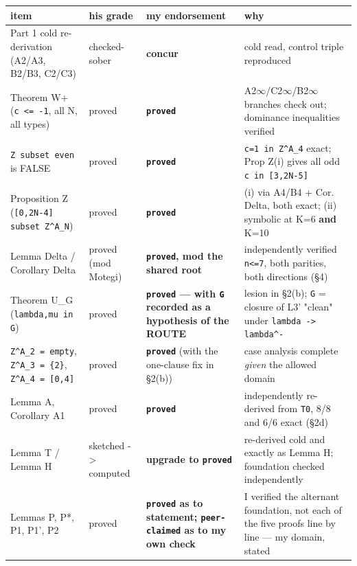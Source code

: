 \documentclass[11pt,a4paper]{article}
\begin{document}
\begin{center}\footnotesize
\begin{tabular}{@{}p{}p{}p{}p{}@{}}
\hline
\textbf{item} & \textbf{his grade} & \textbf{my endorsement} & \textbf{why}\\ \hline
Part 1 cold re-derivation (A2/A3, B2/B3, C2/C3) & checked-sober & \textbf{concur} & cold read, control triple reproduced\\
Theorem W+ (\mbox{\texttt{c <= -1}}, all N, all types) & proved & \textbf{\mbox{\texttt{proved}}} & A2$\infty$/C2$\infty$/B2$\infty$ branches check out; dominance inequalities verified\\
\mbox{\texttt{Z subset even}} is FALSE & proved & \textbf{\mbox{\texttt{proved}}} & \mbox{\texttt{c=1 in Z\textasciicircum{}A\_4}} exact; Prop Z(i) gives all odd \mbox{\texttt{c in [3,2N-5]}}\\
Proposition Z (\mbox{\texttt{[0,2N-4] subset Z\textasciicircum{}A\_N}}) & proved & \textbf{\mbox{\texttt{proved}}} & (i) via A4/B4 + Cor. Delta, both exact; (ii) symbolic at K=6 \textbf{and} K=10\\
Lemma Delta / Corollary Delta & proved (mod Motegi) & \textbf{\mbox{\texttt{proved}}, mod the shared root} & independently verified \mbox{\texttt{n<=7}}, both parities, both directions (\S{}4)\\
Theorem U\_G (\mbox{\texttt{lambda,mu in G}}) & proved & \textbf{\mbox{\texttt{proved}} --- with \mbox{\texttt{G}} recorded as a hypothesis of the ROUTE} & lesion in \S{}2(b); \mbox{\texttt{G}} = closure of L3' "clean" under \mbox{\texttt{lambda -> lambda\textasciicircum{}-}}\\
\mbox{\texttt{Z\textasciicircum{}A\_2 = empty}}, \mbox{\texttt{Z\textasciicircum{}A\_3 = \{2\}}}, \mbox{\texttt{Z\textasciicircum{}A\_4 = [0,4]}} & proved & \textbf{\mbox{\texttt{proved}}} (with the one-clause fix in \S{}2(b)) & case analysis complete \emph{given} the allowed domain\\
Lemma A, Corollary A1 & proved & \textbf{\mbox{\texttt{proved}}} & independently re-derived from \mbox{\texttt{T0}}, 8/8 and 6/6 exact (\S{}2d)\\
Lemma T / Lemma H & sketched -> computed & \textbf{upgrade to \mbox{\texttt{proved}}} & re-derived cold and exactly as Lemma H; foundation checked independently\\
Lemmas P, P*, P1, P1', P2 & proved & \textbf{\mbox{\texttt{proved}} as to statement; \mbox{\texttt{peer-claimed}} as to my own check} & I verified the alternant foundation, not each of the five proofs line by line --- my domain, stated\\

\end{tabular}
\end{center}
\end{document}
